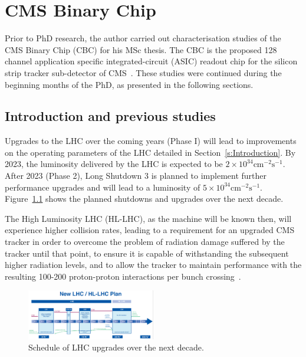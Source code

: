 \chapter{CMS Binary Chip}
\label{c:cbc}

Prior to PhD research, the author carried out characterisation studies of the CMS Binary Chip (CBC) for his
MSc thesis. The CBC is the proposed 128 channel application specific integrated-circuit (ASIC) readout chip
for the silicon strip tracker sub-detector of CMS~\cite{JacobJA}. These studies were continued during the
beginning months of the PhD, as presented in the following sections.

\section{Introduction and previous studies}
\label{s:introduction_and_previous_studies}

Upgrades to the LHC over the coming years (Phase I) will lead to improvements on the operating parameters of
the LHC detailed in Section~\ref{s:Introduction}. By 2023, the luminosity delivered by the LHC is expected to
be $2\times10^{34}\mathrm{cm^{-2}s^{-1}}$. After 2023 (Phase 2), Long Shutdown 3 is planned to implement
further performance upgrades and will lead to a luminosity of $5\times10^{34}\mathrm{cm^{-2}s^{-1}}$.
Figure~\ref{fig:lhc_upgrades} shows the planned shutdowns and upgrades over the next decade.

The High Luminosity LHC (HL-LHC), as the machine will be known then, will experience higher collision rates,
leading to a requirement for an upgraded CMS tracker in order to overcome the problem of radiation damage
suffered by the tracker until that point, to ensure it is capable of withstanding the subsequent higher
radiation levels, and to allow the tracker to maintain performance with the resulting 100-200 proton-proton
interactions per bunch crossing~\cite{Mersi:2011jv}.

\begin{figure}[ht] %
   \centering
     \includegraphics[width=0.5\textwidth]{Chapters/07_Appendices/07c_2_Images/newlhcplan}\hfill
     \caption{Schedule of LHC upgrades over the next decade.}
     \label{fig:lhc_upgrades}
\end{figure}

